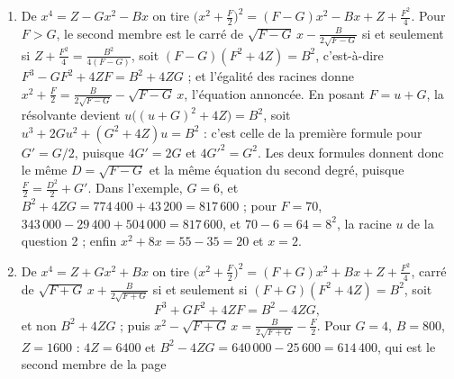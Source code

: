 \documentclass[11pt,a4paper]{article}
\begin{document}
\begin{solution}
\begin{enumerate}
  $u(u + 2G)^2 + 4Zu = B^2$, qui est la résolvante. Enfin
  $p = \frac{(p + q) - (q - p)}{2} = G + \frac{D^2}{2} - \frac{B}{2D}$ : le facteur
  $x^2 + Dx + p$ est exactement l'équation du feuillet. La quartique n'a pas de terme
  en $x^3$, donc $r_1 + r_2 + r_3 + r_4 = 0$. En groupant $r_1, r_2$ d'un côté et
  $r_3, r_4$ de l'autre, $(x - r_1)(x - r_2)(x - r_3)(x - r_4)$ est une factorisation
  de la forme cherchée avec $D = -(r_1 + r_2) = r_3 + r_4$ : $(r_1 + r_2)^2$ est
  racine de la résolvante, et de même $(r_1 + r_3)^2$ et $(r_1 + r_4)^2$ pour les
  deux autres groupements. Dans l'exemple, avec $r_1 = 2$ :
  $(2 - 10)^2 = 64$ et $(2 + 4 \pm i\sqrt{74})^2 = (6 \pm i\sqrt{74})^2
  = -38 \pm 12\,i\sqrt{74}$. Ces trois nombres sont distincts, et une équation du
  troisième degré n'a pas plus de trois racines : ce sont les racines de la
  résolvante, $u^3 + 12u^2 + 7236u - 774\,400 = (u - 64)(u^2 + 76u + 12\,100)$. La
  racine positive que prend le feuillet est la seule réelle.
\item De $x^4 = Z - Gx^2 - Bx$ on tire
  $\bigl(x^2 + \frac{F}{2}\bigr)^2 = (F - G)x^2 - Bx + Z + \frac{F^2}{4}$. Pour
  $F > G$, le second membre est le carré de
  $\sqrt{F - G}\,x - \frac{B}{2\sqrt{F - G}}$ si et seulement si
  $Z + \frac{F^2}{4} = \frac{B^2}{4(F - G)}$, soit $(F - G)(F^2 + 4Z) = B^2$,
  c'est-à-dire $F^3 - GF^2 + 4ZF = B^2 + 4ZG$ ; et l'égalité des racines donne
  $x^2 + \frac{F}{2} = \frac{B}{2\sqrt{F - G}} - \sqrt{F - G}\,x$, l'équation
  annoncée. En posant $F = u + G$, la résolvante devient
  $u\bigl((u + G)^2 + 4Z\bigr) = B^2$, soit $u^3 + 2Gu^2 + (G^2 + 4Z)u = B^2$ : c'est
  celle de la première formule pour $G' = G/2$, puisque $4G' = 2G$ et
  $4G'^2 = G^2$. Les
  deux formules donnent donc le même $D = \sqrt{F - G}$ et la même équation du
  second degré, puisque $\frac{F}{2} = \frac{D^2}{2} + G'$. Dans l'exemple, $G = 6$,
  et $B^2 + 4ZG = 774\,400 + 43\,200 = 817\,600$ ; pour $F = 70$,
  $343\,000 - 29\,400 + 504\,000 = 817\,600$, et $70 - 6 = 64 = 8^2$, la racine $u$ de
  la question 2 ; enfin $x^2 + 8x = 55 - 35 = 20$ et $x = 2$.
\item De $x^4 = Z + Gx^2 + Bx$ on tire
  $\bigl(x^2 + \frac{F}{2}\bigr)^2 = (F + G)x^2 + Bx + Z + \frac{F^2}{4}$, carré de
  $\sqrt{F + G}\,x + \frac{B}{2\sqrt{F + G}}$ si et seulement si
  $(F + G)(F^2 + 4Z) = B^2$, soit
  \[
  F^3 + GF^2 + 4ZF = B^2 - 4ZG ,
  \]
  et non $B^2 + 4ZG$ ; puis $x^2 - \sqrt{F + G}\,x = \frac{B}{2\sqrt{F + G}} -
  \frac{F}{2}$. Pour $G = 4$, $B = 800$, $Z = 1600$ : $4Z = 6400$ et
  $B^2 - 4ZG = 640\,000 - 25\,600 = 614\,400$, qui est le second membre de la page

\end{enumerate}
\end{solution}
\end{document}

